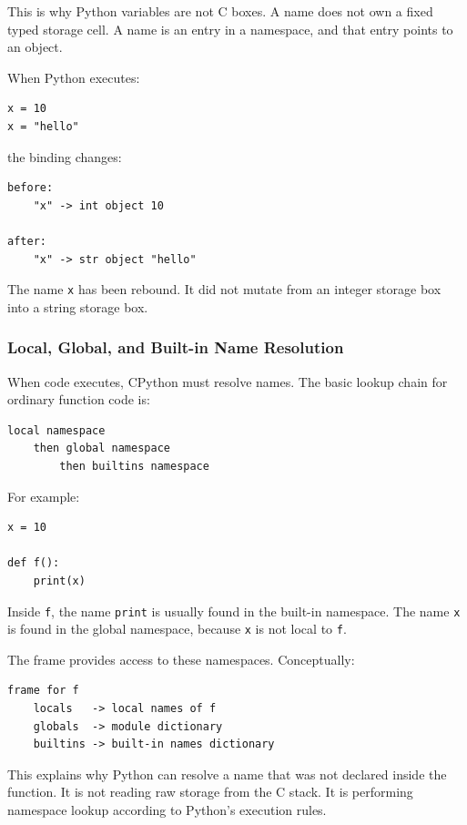 This is why Python variables are not C boxes. A name does not own a fixed typed storage cell. A name is an entry in a namespace, and that entry points to an object.

When Python executes:

\begin{verbatim}
x = 10
x = "hello"
\end{verbatim}

the binding changes:

\begin{verbatim}
before:
    "x" -> int object 10

after:
    "x" -> str object "hello"
\end{verbatim}

The name \texttt{x} has been rebound. It did not mutate from an integer storage box into a string storage box.

\subsubsection{Local, Global, and Built-in Name Resolution}

When code executes, CPython must resolve names. The basic lookup chain for ordinary function code is:

\begin{verbatim}
local namespace
    then global namespace
        then builtins namespace
\end{verbatim}

For example:

\begin{verbatim}
x = 10

def f():
    print(x)
\end{verbatim}

Inside \texttt{f}, the name \texttt{print} is usually found in the built-in namespace. The name \texttt{x} is found in the global namespace, because \texttt{x} is not local to \texttt{f}.

The frame provides access to these namespaces. Conceptually:

\begin{verbatim}
frame for f
    locals   -> local names of f
    globals  -> module dictionary
    builtins -> built-in names dictionary
\end{verbatim}

This explains why Python can resolve a name that was not declared inside the function. It is not reading raw storage from the C stack. It is performing namespace lookup according to Python's execution rules.

